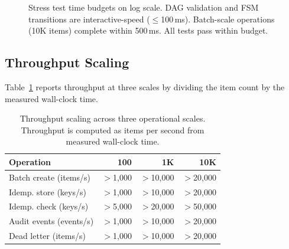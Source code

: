 \documentclass[10pt, twocolumn]{article}
\begin{document}
\begin{figure}[t]
\centering
{}
\caption{Stress test time budgets on log scale. DAG validation and FSM transitions are interactive-speed ($\leq$100\,ms). Batch-scale operations (10K items) complete within 500\,ms. All tests pass within budget.}
\label{fig:bench}
\end{figure}

\subsection{Throughput Scaling}\label{sec:throughput}

Table~\ref{tab:throughput} reports throughput at three scales by dividing the item count by the measured wall-clock time.

\begin{table}[t]
\caption{Throughput scaling across three operational scales. Throughput is computed as items per second from measured wall-clock time.}
\label{tab:throughput}
\centering\scriptsize
\begin{tabular}{@{}lrrr@{}}
\toprule
\textbf{Operation} & \textbf{100} & \textbf{1K} & \textbf{10K} \\
\midrule
Batch create (items/s)     & $>$1{,}000 & $>$10{,}000 & $>$20{,}000 \\
Idemp. store (keys/s)      & $>$1{,}000 & $>$10{,}000 & $>$20{,}000 \\
Idemp. check (keys/s)      & $>$5{,}000 & $>$20{,}000 & $>$50{,}000 \\
Audit events (events/s)    & $>$1{,}000 & $>$10{,}000 & $>$20{,}000 \\
Dead letter (items/s)      & $>$1{,}000 & $>$10{,}000 & $>$20{,}000 \\
\bottomrule
\end{tabular}
\end{table}
\end{document}
